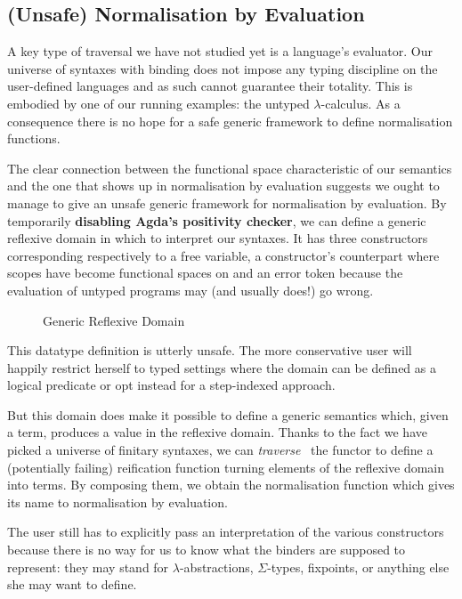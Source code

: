 \subsection{(Unsafe) Normalisation by Evaluation}

A key type of traversal we have not studied yet is a language's
evaluator. Our universe of syntaxes with binding does not impose
any typing discipline on the user-defined languages and as such
cannot guarantee their totality. This is embodied by one of our running
examples: the untyped $\lambda$-calculus. As a consequence there
is no hope for a safe generic framework to define normalisation
functions.

The clear connection between the  functional space
characteristic of our semantics and the one that shows up in
normalisation by evaluation suggests we ought to manage to
give an unsafe generic framework for normalisation by evaluation.
By temporarily \textbf{disabling Agda's positivity checker},
we can define a generic reflexive domain  in which to
interpret our syntaxes. It has three constructors corresponding
respectively to a free variable, a constructor's counterpart where
scopes have become  functional spaces on  and
an error token because the evaluation of untyped programs may
(and usually does!) go wrong.

\begin{figure}[h]
\caption{Generic Reflexive Domain}
\end{figure}

This datatype definition is utterly unsafe. The more conservative
user will happily restrict herself to typed settings where the
domain can be defined as a logical predicate or opt instead for
a step-indexed approach.

But this domain does make it possible to define a generic 
semantics which, given a term, produces a value in the reflexive
domain. Thanks to the fact we have picked a universe of finitary syntaxes, we
can \emph{traverse}~\cite{mcbride_paterson_2008} the functor to define
a (potentially failing) reification function turning elements of the
reflexive domain into terms. By composing them, we obtain the
normalisation function which gives its name to normalisation by
evaluation.

The user still has to explicitly pass an interpretation of
the various constructors because there is no way for us to
know what the binders are supposed to represent: they may
stand for $\lambda$-abstractions, $\Sigma$-types, fixpoints, or
anything else she may want to define.


